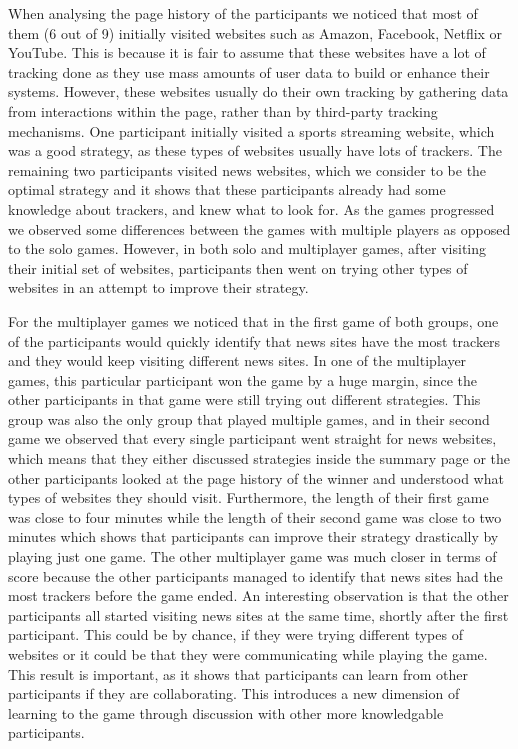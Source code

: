 \documentclass{l4proj}
\begin{document}
When analysing the page history of the participants we noticed that most of them (6 out of 9) initially visited websites such as Amazon, Facebook, Netflix or YouTube. This is because it is fair to assume that these websites have a lot of tracking done as they use mass amounts of user data to build or enhance their systems. However, these websites usually do their own tracking by gathering data from interactions within the page, rather than by third-party tracking mechanisms. One participant initially visited a sports streaming website, which was a good strategy, as these types of websites usually have lots of trackers. The remaining two participants visited news websites, which we consider to be the optimal strategy and it shows that these participants already had some knowledge about trackers, and knew what to look for.
As the games progressed we observed some differences between the games with multiple players as opposed to the solo games. However, in both solo and multiplayer games, after visiting their initial set of websites, participants then went on trying other types of websites in an attempt to improve their strategy. 

For the multiplayer games we noticed that in the first game of both groups, one of the participants would quickly identify that news sites have the most trackers and they would keep visiting different news sites. 
In one of the multiplayer games, this particular participant won the game by a huge margin, since the other participants in that game were still trying out different strategies. This group was also the only group that played multiple games, and in their second game we observed that every single participant went straight for news websites, which means that they either discussed strategies inside the summary page or the other participants looked at the page history of the winner and understood what types of websites they should visit. Furthermore, the length of their first game was close to four minutes while the length of their second game was close to two minutes which shows that participants can improve their strategy drastically by playing just one game. The other multiplayer game was much closer in terms of score because the other participants managed to identify that news sites had the most trackers before the game ended. An interesting observation is that the other participants all started visiting news sites at the same time, shortly after the first participant. This could be by chance, if they were trying different types of websites or it could be that they were communicating while playing the game. This result is important, as it shows that participants can learn from other participants if they are collaborating. This introduces a new dimension of learning to the game through discussion with other more knowledgable participants.
\end{document}
